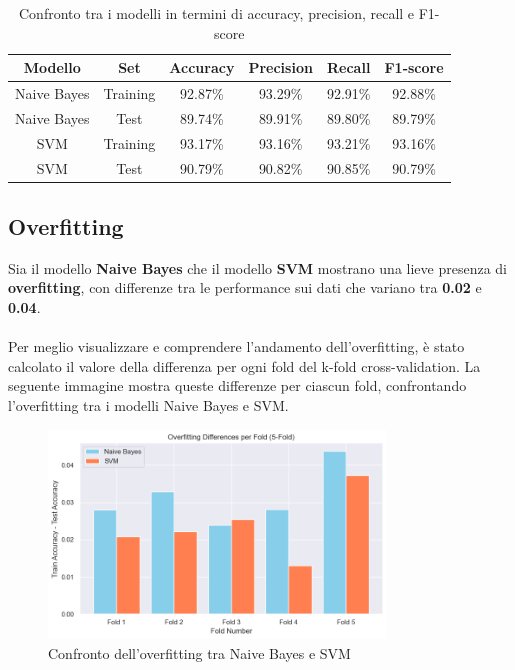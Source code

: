 \begin{table}[H]
    \centering
    \begin{tabular}{|c|c|c|c|c|c|}
        \hline
        \textbf{Modello} & \textbf{Set} & \textbf{Accuracy} & \textbf{Precision} & \textbf{Recall} & \textbf{F1-score} \\
        \hline
        Naive Bayes & Training & 92.87\% & 93.29\% & 92.91\% & 92.88\% \\
        \hline
        Naive Bayes & Test & 89.74\% & 89.91\% & 89.80\% & 89.79\% \\
        \hline
        SVM & Training & 93.17\% & 93.16\% & 93.21\% & 93.16\% \\
        \hline
        SVM & Test & 90.79\% & 90.82\% & 90.85\% & 90.79\% \\
        \hline
    \end{tabular}
    \caption{Confronto tra i modelli in termini di accuracy, precision, recall e F1-score}
    \label{tab:confronto_metriche}
\end{table}


\subsection{Overfitting}

Sia il modello \textbf{Naive Bayes} che il modello \textbf{SVM} mostrano una lieve presenza di \textbf{overfitting}, con differenze tra le performance sui dati che variano tra \textbf{0.02} e \textbf{0.04}. \\ \\
Per meglio visualizzare e comprendere l'andamento dell'overfitting, è stato calcolato il valore della differenza per ogni fold del k-fold cross-validation. La seguente immagine mostra queste differenze per ciascun fold, confrontando l'overfitting tra i modelli Naive Bayes e SVM.

\begin{figure}[H]
    \centering
    \includegraphics[width=0.8\textwidth]{images/overfitting_differences.png}
    \caption{Confronto dell'overfitting tra Naive Bayes e SVM}
    \label{fig:overfitting_differences}
\end{figure}

